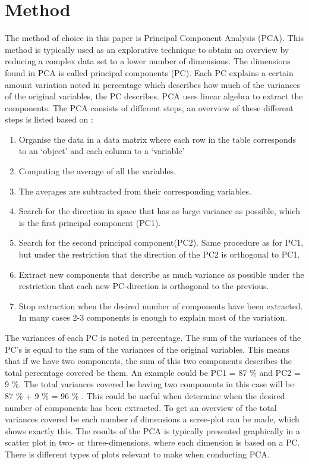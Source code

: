 \section*{Method}
\label{Method}
%
The method of choice in this paper is Principal Component Analysis (PCA). This method is typically used as an explorative technique to obtain an overview by reducing a complex data set to a lower number of dimensions. The dimensions found in PCA is called principal components (PC). Each PC explains a certain amount variation noted in percentage which describes how much of the variances of the original variables, the PC describes.\blankline
%
PCA uses linear algebra to extract the components. The PCA consists of different steps, an overview of these different steps is listed based on \textcite[pp. 211-213]{Naes2010}:

\begin{enumerate}
	\item Organise the data in a data matrix where each row in the table corresponds to an ‘object’ and each column to a ‘variable’
	\item Computing the average of all the variables. 
	\item The averages are subtracted from their corresponding variables.
	\item Search for the direction in space that has as large variance as possible, which is the first principal component (PC1).
	\item Search for the second principal component(PC2). Same procedure as for PC1, but under the restriction that the direction of the PC2 is orthogonal to PC1. 
	\item Extract new components that describe as much variance as possible under the restriction that each new PC-direction is orthogonal to the previous.
	\item Stop extraction when the desired number of components have been extracted. In many cases 2-3 components is enough to explain most of the variation. 
\end{enumerate}
\blankline
%
The variances of each PC is noted in percentage.
The sum of the variances of the PC's is equal to the sum of the variances of the original variables. This means that if we have two components, the sum of this two components describes the total percentage covered be them. An example could be PC1 = 87 \% and PC2 = 9 \%. The total variances covered be having two components in this case will be 87 \% + 9 \% = 96 \% \parencite[p. 213]{Naes2010}. This could be useful when determine when the desired number of components has been extracted. To get an overview of the total variances covered be each number of dimensions a scree-plot can be made, which shows exactly this. \blankline
%
The results of the PCA is typically presented graphically in a scatter plot in two- or three-dimensions, where each dimension is based on a PC. There is different types of plots relevant to make when conducting PCA. 

